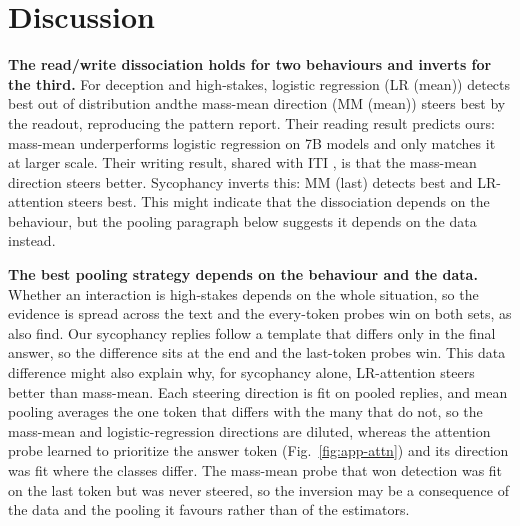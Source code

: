 
\section{Discussion}


\textbf{The read/write dissociation holds for two behaviours and inverts for
the third.} For deception and high-stakes, logistic regression (LR (mean)) detects best out of
distribution andthe mass-mean direction (MM (mean)) steers best by the readout, reproducing the
pattern \citeauthor{marks2024} report. Their reading result
predicts ours: mass-mean underperforms logistic regression on 7B models
and only matches it at larger scale. Their writing result, shared with ITI
\citep{li2023}, is that the mass-mean direction steers better. Sycophancy
inverts this: MM (last) detects best and LR-attention steers best. This
might indicate that the dissociation depends on the behaviour, but the
pooling paragraph below suggests it depends on the data instead.

\textbf{The best pooling strategy depends on the behaviour and the data.}
Whether an interaction is high-stakes depends on the whole situation, so
the evidence is spread across the text and the every-token probes win on
both sets, as \citeauthor{mckenzie2025} also find. Our sycophancy replies
follow a template that differs only in the final answer, so the
difference sits at the end and the last-token probes win. This data
difference might also explain why, for sycophancy alone, LR-attention
steers better than mass-mean. Each steering direction is fit on pooled
replies, and mean pooling averages the one token that differs with the
many that do not, so the mass-mean and logistic-regression directions are
diluted, whereas the attention probe learned to prioritize the answer token
(Fig.~\ref{fig:app-attn}) and its direction was fit where the classes
differ. The mass-mean probe that won detection was fit on the last token
but was never steered, so the inversion may be a consequence of the data
and the pooling it favours rather than of the estimators.

